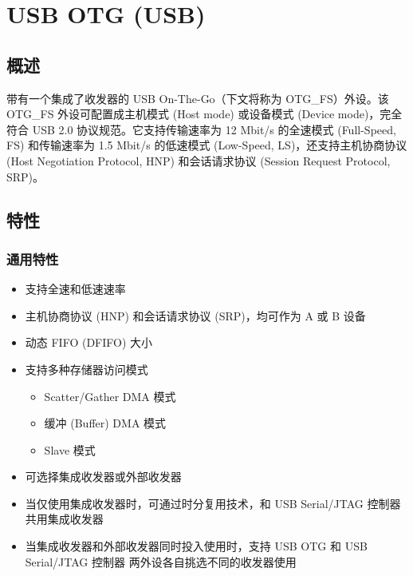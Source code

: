 \documentclass[main\_\_CN.tex]{subfiles}
\begin{document}

\ifglobal
\else
    {\let\clearpage\relax \listoftodos}
    \tableofcontents
\fi




\hypertarget{usbotg}{}
\chapter{USB OTG (USB)}
\label{mod:usbotg}

\section{概述}
\chipname{} 带有一个集成了收发器的 USB On-The-Go（下文将称为 OTG\_FS）外设。该 OTG\_FS 外设可配置成主机模式 (Host mode) 或设备模式 (Device mode)，完全符合 USB 2.0 协议规范。它支持传输速率为 12 Mbit/s 的全速模式 (Full-Speed, FS) 和传输速率为 1.5 Mbit/s 的低速模式 (Low-Speed, LS)，还支持主机协商协议 (Host Negotiation Protocol, HNP) 和会话请求协议 (Session Request Protocol, SRP)。

\section{特性}

\subsection{通用特性}
\begin{itemize}
    \item 支持全速和低速速率
    \item 主机协商协议 (HNP) 和会话请求协议 (SRP)，均可作为 A 或 B 设备
    \item 动态 FIFO (DFIFO) 大小
    \item 支持多种存储器访问模式
    \begin{itemize}
        \item Scatter/Gather DMA 模式
        \item 缓冲 (Buffer) DMA 模式
        \item Slave 模式
    \end{itemize}
    \item 可选择集成收发器或外部收发器
    \item 当仅使用集成收发器时，可通过时分复用技术，和 USB Serial/JTAG 控制器共用集成收发器
    \item 当集成收发器和外部收发器同时投入使用时，支持 USB OTG 和 USB Serial/JTAG 控制器 两外设各自挑选不同的收发器使用
\end{itemize}
\end{document}
